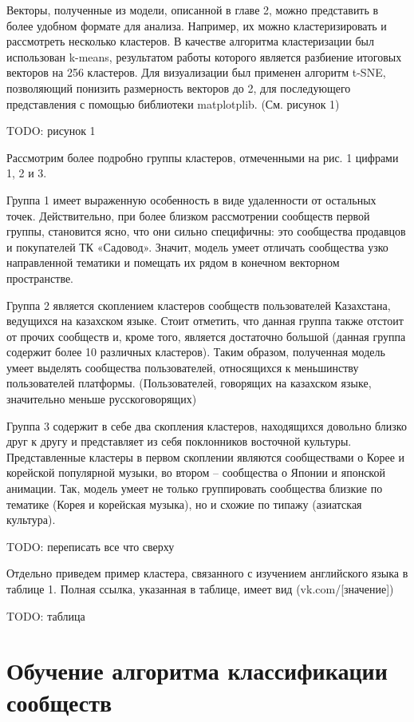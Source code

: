 \documentclass[times,specification,annotation]{itmo-student-thesis}
\begin{document}
Векторы, полученные из модели, описанной в главе 2, можно представить в
более удобном формате для анализа. Например, их можно кластеризировать и
рассмотреть несколько кластеров. В качестве алгоритма кластеризации был
использован k-means, результатом работы которого является разбиение итоговых
векторов на 256 кластеров. Для визуализации был применен алгоритм t-SNE,
позволяющий понизить размерность векторов до 2, для последующего
представления с помощью библиотеки matplotplib. (См. рисунок 1)

TODO: рисунок 1

Рассмотрим более подробно группы кластеров, отмеченными на рис. 1
цифрами 1, 2 и 3.

Группа 1 имеет выраженную особенность в виде удаленности от остальных
точек. Действительно, при более близком рассмотрении сообществ первой группы,
становится ясно, что они сильно специфичны: это сообщества продавцов и
покупателей ТК «Садовод». Значит, модель умеет отличать сообщества узко
направленной тематики и помещать их рядом в конечном векторном пространстве.

Группа 2 является скоплением кластеров сообществ пользователей
Казахстана, ведущихся на казахском языке. Стоит отметить, что данная группа
также отстоит от прочих сообществ и, кроме того, является достаточно большой
(данная группа содержит более 10 различных кластеров). Таким образом,
полученная модель умеет выделять сообщества пользователей, относящихся к
меньшинству пользователей платформы. (Пользователей, говорящих на казахском
языке, значительно меньше русскоговорящих)

Группа 3 содержит в себе два скопления кластеров, находящихся довольно
близко друг к другу и представляет из себя поклонников восточной культуры.
Представленные кластеры в первом скоплении являются сообществами о Корее и
корейской популярной музыки, во втором – сообщества о Японии и японской
анимации. Так, модель умеет не только группировать сообщества близкие по
тематике (Корея и корейская музыка), но и схожие по типажу (азиатская культура).

TODO: переписать все что сверху

Отдельно приведем пример кластера, связанного с изучением английского
языка в таблице 1. Полная ссылка, указанная в таблице, имеет вид
(vk.com/[значение])

TODO: таблица

\section{Обучение алгоритма классификации сообществ}
\end{document}
